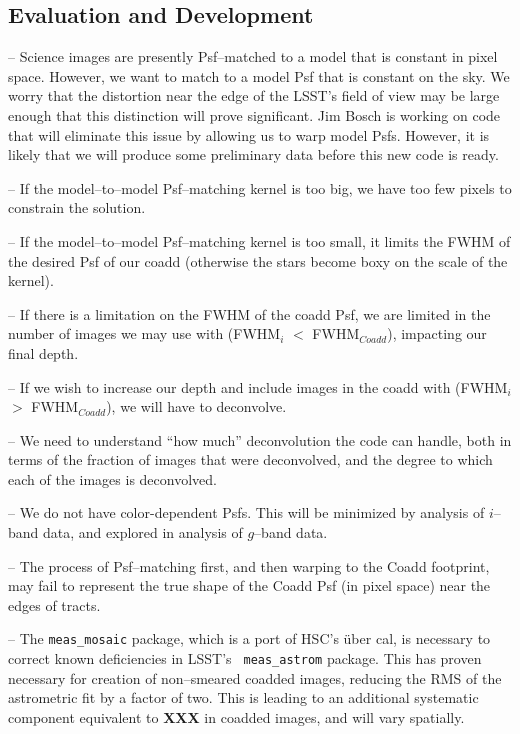 \documentclass[12pt]{article}
\begin{document}
\subsection{Evaluation and Development}

-- Science images are presently Psf--matched to a model that is constant in pixel space.
However, we want to match to a model Psf that is constant on the sky. We worry that the
distortion near the edge of the LSST's field of view may be large enough
that this distinction will prove significant. Jim Bosch is working on code
that will eliminate this issue by allowing us to warp model Psfs.
However, it is likely that we will produce some preliminary data before this new code is ready.

-- If the model--to--model Psf--matching kernel is too big, we have
too few pixels to constrain the solution.

-- If the model--to--model Psf--matching kernel is too small, it
limits the FWHM of the desired Psf of our coadd (otherwise the stars
become boxy on the scale of the kernel).

-- If there is a limitation on the FWHM of the coadd Psf, we are
limited in the number of images we may use with (FWHM$_i$ $<$
FWHM$_{Coadd}$), impacting our final depth.

-- If we wish to increase our depth and include images in the coadd
with (FWHM$_i$ $>$ FWHM$_{Coadd}$), we will have to deconvolve.

-- We need to understand ``how much'' deconvolution the code can handle,
both in terms of the fraction of images that were deconvolved, and the
degree to which each of the images is deconvolved.

-- We do not have color-dependent Psfs.  This will be minimized by
analysis of $i$--band data, and explored in analysis of $g$--band
data.

-- The process of Psf--matching first, and then warping to the Coadd
footprint, may fail to represent the true shape of the Coadd Psf (in
pixel space) near the edges of tracts.

-- The {\tt meas\_mosaic} package, which is a port of HSC's \"{u}ber
cal, is necessary to correct known deficiencies in LSST's {\tt
  meas\_astrom} package.  This has proven necessary for creation of
non--smeared coadded images, reducing the RMS of the astrometric fit
by a factor of two.  This is leading to an additional systematic
component equivalent to {\bf XXX} in coadded images, and will vary
spatially.
\end{document}
